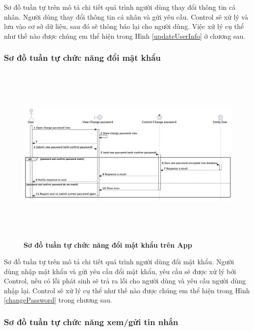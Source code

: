  Sơ đồ tuần tự trên mô tả chi tiết quá trình người dùng thay đổi thông tin cá nhân. Người dùng thay đổi thông tin cá nhân
  và gửi yêu cầu. Control sẽ xử lý và lưu vào cơ sở dữ liệu, sau đó sẽ thông báo lại cho người dùng.
  Việc xử lý cụ thể như thế nào được chúng em thể hiện trong Hình \ref{updateUserInfo} ở chương sau.

  \subsubsection{Sơ đồ tuần tự chức năng đổi mật khẩu}

  \begin{figure}[H]
        \centering
        \includegraphics[width=16cm,height=9cm]{Images/mobile_app/change_password.png}
        \caption[Sơ đồ tuần tự chức năng đổi mật khẩu trên App]{\bfseries \fontsize{12pt}{0pt}
        \selectfont Sơ đồ tuần tự chức năng đổi mật khẩu trên App}
        \label{change_password} %
  \end{figure}

  Sơ đồ tuần tự trên mô tả chi tiết quá trình người dùng đổi mật khẩu. Người dùng nhập mật khẩu và gửi yêu cầu đổi mật khẩu, 
  yêu cầu sẽ được xử lý bởi Control, nếu có lỗi phát sinh sẽ trả ra lỗi cho người dùng và yêu cầu người dùng nhập lại. Control
  sẽ xử lý cụ thể như thế nào được chúng em thể hiện trong Hình \ref{changePassword} trong chương sau.

\subsubsection{Sơ đồ tuần tự chức năng xem/gửi tin nhắn}

